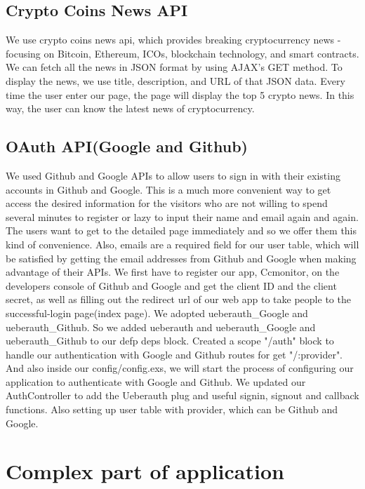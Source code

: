 \subsection{Crypto Coins News API}
We use crypto coins news api, which provides breaking cryptocurrency
news - focusing on Bitcoin, Ethereum, ICOs, blockchain technology,
and smart contracts. We can fetch all the news in JSON format by
using AJAX's GET method. To display the news, we use title, description,
and URL of that JSON data. Every time the user enter our page, the 
page will display the top 5 crypto news. In this way, the user 
can know the latest news of cryptocurrency.
\subsection{OAuth API(Google and Github)}
We used Github and Google APIs to allow users to sign in with 
their existing accounts in Github and Google. This is a much 
more convenient way to get access the desired information for 
the visitors who are not willing to spend several minutes to 
register or lazy to input their name and email again and again. 
The users want to get to the detailed page immediately and so 
we offer them this kind of convenience. Also, emails are a 
required field for our user table, which will be satisfied by 
getting the email addresses from Github and Google when making 
advantage of their APIs. We first have to register our app, 
Ccmonitor, on the developers console of Github and Google and 
get the client ID and the client secret, as well as filling out 
the redirect url of our web app to take people to the successful-login 
page(index page). We adopted ueberauth\_Google and ueberauth\_Github. 
So we added ueberauth and ueberauth\_Google and ueberauth\_Github 
to our defp deps block. Created a scope "/auth" block to handle 
our authentication with Google and Github routes for get "/:provider". 
And also inside our config/config.exs, we will start the process 
of configuring our application to authenticate with Google and Github. 
We updated our AuthController to add the Ueberauth plug and useful 
signin, signout and callback functions. Also setting up user table 
with provider, which can be Github and Google.


\section{Complex part of application}
